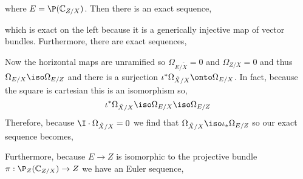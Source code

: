 \documentclass[12pt]{article}
\begin{document}
\begin{center}
\end{center}
where $E = \P(\C_{Z/X})$.
Then there is an exact sequence,
\begin{center}
\end{center}
which is exact on the left because it is a generically injective map of vector bundles. Furthermore, there are exact sequences,
\begin{center}
\end{center}
Now the horizontal maps are unramified so $\Omega_{E/\tilde{X}} = 0$ and $\Omega_{Z/X} = 0$ and thus $\Omega_{E/X} \iso \Omega_{E/Z}$ and there is a surjection $\iota^* \Omega_{\tilde{X}/X} \onto \Omega_{E/X}$. In fact, because the square is cartesian this is an isomorphism so,
\[ \iota^* \Omega_{\tilde{X}/X} \iso \Omega_{E/X} \iso \Omega_{E/Z} \]
Therefore, because $\I \cdot \Omega_{\tilde{X}/X} = 0$ we find that $\Omega_{\tilde{X}/X} \iso \iota_* \Omega_{E/Z}$ so our exact sequence becomes,
\begin{center}
\end{center}
Furthermore, because $E \to Z$ is isomorphic to the projective bundle $\pi : \P_Z(\C_{Z/X}) \to Z$ we have an Euler sequence,
\begin{center}
\end{center}
\end{document}
